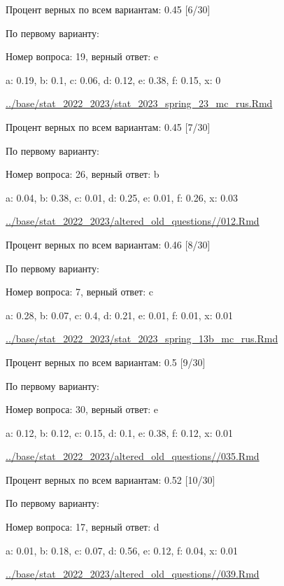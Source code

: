

Процент верных по всем вариантам: 0.45 [6/30]

По первому варианту:

Номер вопроса: 19, верный ответ: e

a: 0.19, b: 0.1, c: 0.06, d: 0.12, e: 0.38, f: 0.15, x: 0

\url{../base/stat_2022_2023/stat_2023_spring_23_mc_rus.Rmd}





Процент верных по всем вариантам: 0.45 [7/30]

По первому варианту:

Номер вопроса: 26, верный ответ: b

a: 0.04, b: 0.38, c: 0.01, d: 0.25, e: 0.01, f: 0.26, x: 0.03

\url{../base/stat_2022_2023/altered_old_questions//012.Rmd}





Процент верных по всем вариантам: 0.46 [8/30]

По первому варианту:

Номер вопроса: 7, верный ответ: c

a: 0.28, b: 0.07, c: 0.4, d: 0.21, e: 0.01, f: 0.01, x: 0.01

\url{../base/stat_2022_2023/stat_2023_spring_13b_mc_rus.Rmd}





Процент верных по всем вариантам: 0.5 [9/30]

По первому варианту:

Номер вопроса: 30, верный ответ: e

a: 0.12, b: 0.12, c: 0.15, d: 0.1, e: 0.38, f: 0.12, x: 0.01

\url{../base/stat_2022_2023/altered_old_questions//035.Rmd}





Процент верных по всем вариантам: 0.52 [10/30]

По первому варианту:

Номер вопроса: 17, верный ответ: d

a: 0.01, b: 0.18, c: 0.07, d: 0.56, e: 0.12, f: 0.04, x: 0.01

\url{../base/stat_2022_2023/altered_old_questions//039.Rmd}



